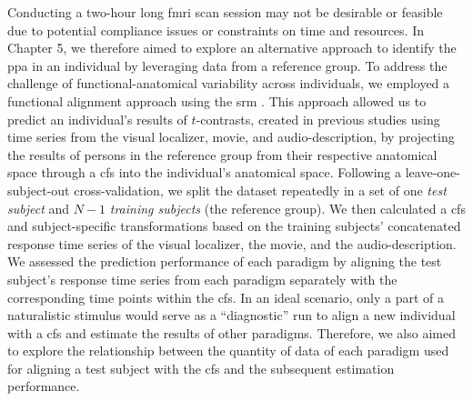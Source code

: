 %
Conducting a two-hour long \ac{fmri} scan session may not be desirable or
feasible due to potential compliance issues or constraints on time and
resources.
%
In Chapter 5, we therefore aimed to explore an alternative approach to identify
the \ac{ppa} in an individual by leveraging data from a reference group.
%
To address the challenge of functional-anatomical variability across
individuals, we employed a functional alignment approach using the \acf{srm}
\citep{chen2015reduced}.
%
This approach allowed us to predict an individual's results of $t$-contrasts,
created in previous studies using time series from the visual localizer, movie,
and audio-description, by projecting the results of persons in the reference
group from their respective anatomical space through a \ac{cfs} into the
individual's anatomical space.
%
Following a leave-one-subject-out cross-validation, we split the dataset
repeatedly in a set of one \textit{test subject} and $N-1$ \textit{training
subjects} (the reference group).
%
We then calculated a \ac{cfs} and subject-specific transformations based on the
training subjects' concatenated response time series of the visual localizer,
the movie, and the audio-description.
%
We assessed the prediction performance of each paradigm by aligning the test
subject's response time series from each paradigm separately with the
corresponding time points within the \ac{cfs}.
%
In an ideal scenario, only a part of a naturalistic stimulus would serve as a
``diagnostic'' run to align a new individual with a \ac{cfs} and estimate the
results of other paradigms.
%
Therefore, we also aimed to explore the relationship between the quantity of
data of each paradigm used for aligning a test subject with the \ac{cfs} and the
subsequent estimation performance.



